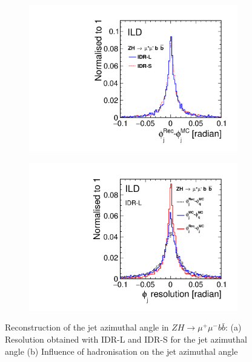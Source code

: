 \begin{figure}[htbp]
\begin{subfigure}{0.49\hsize} \includegraphics[width=\textwidth]{Performance/fig/phij1h.pdf}
 \caption{ \label{fig:mh:res:phi_LS}}
 \end{subfigure}
\begin{subfigure}{0.49\hsize} \includegraphics[width=\textwidth]{Performance/fig/phi_res.pdf}
 \caption{  \label{fig:mh:res:phi_hadronisation}}
 \end{subfigure}
\caption{Reconstruction of the jet azimuthal angle in $ZH \to \mu^+ \mu^- b\bar{b}$: 
(a) Resolution obtained with IDR-L and IDR-S for the jet azimuthal angle
(b) Influence of hadronisation on the jet azimuthal angle
}
\label{fig:mh:res:phi}
\end{figure}


